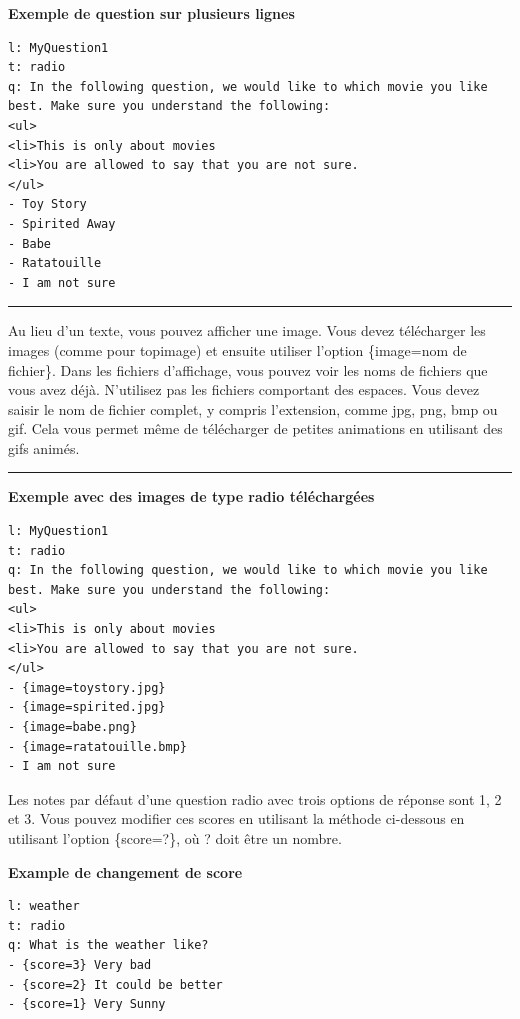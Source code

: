 \documentclass[
]{book}
\begin{document}
\textbf{Exemple de question sur plusieurs lignes}

\begin{verbatim}
l: MyQuestion1
t: radio
q: In the following question, we would like to which movie you like
best. Make sure you understand the following:
<ul>
<li>This is only about movies
<li>You are allowed to say that you are not sure.
</ul>
- Toy Story
- Spirited Away
- Babe
- Ratatouille
- I am not sure
\end{verbatim}

\begin{center}\rule{0.5\linewidth}{0.5pt}\end{center}

Au lieu d'un texte, vous pouvez afficher une image. Vous devez télécharger les images (comme pour topimage) et ensuite utiliser l'option \{image=nom de fichier\}. Dans les fichiers d'affichage, vous pouvez voir les noms de fichiers que vous avez déjà. N'utilisez pas les fichiers comportant des espaces. Vous devez saisir le nom de fichier complet, y compris l'extension, comme jpg, png, bmp ou gif. Cela vous permet même de télécharger de petites animations en utilisant des gifs animés.

\begin{center}\rule{0.5\linewidth}{0.5pt}\end{center}

\textbf{Exemple avec des images de type radio téléchargées}

\begin{verbatim}
l: MyQuestion1
t: radio
q: In the following question, we would like to which movie you like
best. Make sure you understand the following:
<ul>
<li>This is only about movies
<li>You are allowed to say that you are not sure.
</ul>
- {image=toystory.jpg}
- {image=spirited.jpg}
- {image=babe.png}
- {image=ratatouille.bmp}
- I am not sure
\end{verbatim}

Les notes par défaut d'une question radio avec trois options de réponse sont 1, 2 et 3. Vous pouvez modifier ces scores en utilisant la méthode ci-dessous en utilisant l'option \{score=?\}, où ? doit être un nombre.

\textbf{Example de changement de score}

\begin{verbatim}
l: weather
t: radio
q: What is the weather like?
- {score=3} Very bad
- {score=2} It could be better
- {score=1} Very Sunny
\end{verbatim}
\end{document}
